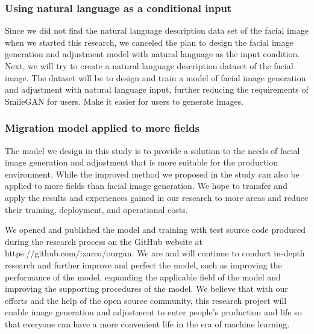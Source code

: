 \subsubsection*{Using natural language as a conditional input}
Since we did not find the natural language description data set of the facial image when we started this research, we canceled the plan to design the facial image generation and adjustment model with natural language as the input condition.
Next, we will try to create a natural language description dataset of the facial image.
The dataset will be to design and train a model of facial image generation and adjustment with natural language input, further reducing the requirements of SmileGAN for users.
Make it easier for users to generate images.
\subsubsection*{Migration model applied to more fields}
The model we design in this study is to provide a solution to the needs of facial image generation and adjustment that is more suitable for the production environment.
While the improved method we proposed in the study can also be applied to more fields than facial image generation.
We hope to transfer and apply the results and experiences gained in our research to more areas and reduce their training, deployment, and operational costs.

\vspace{4ex}

We opened and published the model and training with test source code produced during the research process on the GitHub website at https://github.com/ixarea/ourgan.
We are and will continue to conduct in-depth research and further improve and perfect the model,
    such as improving the performance of the model, expanding the applicable field of the model and improving the supporting procedures of the model.
We believe that with our efforts and the help of the open source community,
    this research project will enable image generation and adjustment to enter people's production and life so that everyone can have a more convenient life in the era of machine learning.






